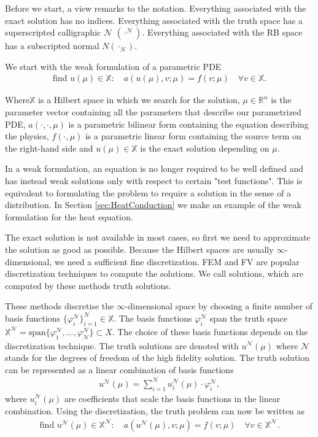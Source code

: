 Before we start, a view remarks to the notation.
Everything associated with the exact solution has no indices.
Everything associated with the truth space has a superscripted calligraphic $\mathcal{ N }$ $\left(\cdot^\mathcal{ N }\right)$.
Everything associated with the RB space has a subscripted normal $N \left(\cdot_N\right)$.

We start with the weak formulation of a parametric PDE
\begin{align}
\text{find }u(\mu) \in \mathbb{X} :\quad a(u(\mu),v;\mu) = f(v;\mu) \quad \forall v \in \mathbb{X}.
\label{eq:weakform}
\end{align}

Where$\mathbb{X}$ is a Hilbert space in which we search for the solution,
$\mu \in \mathbb{R}^n$ is the parameter vector containing all the parameters that describe our parametrized PDE,
$a(\cdot,\cdot,\mu)$ is a parametric bilinear form containing the equation describing the physics,
$f(\cdot,\mu)$ is a parametric linear form containing the source term on the right-hand side and
$u(\mu)\in \mathbb{X}$ is the exact solution depending on $\mu$.

In a weak formulation, an equation is no longer required to be well defined and has instead weak solutions only with respect to certain "test functions". This is equivalent to formulating the problem to require a solution in the sense of a distribution.
In Section \ref{sec:HeatConduction} we make an example of the weak formulation for the heat equation.

The exact solution is not available in most cases, so first we need to approximate the solution as good as possible.
Because the Hilbert spaces are usually $ \infty $-dimensional, we need a sufficient fine discretization.
FEM and FV are popular discretization techniques to compute the solutions.
We call solutions, which are computed by these methods truth solutions.

These methods discretise  the  $ \infty $-dimensional space by choosing a finite number of basis functions $\{ \varphi_i^\mathcal{ N } \}_{i=1}^{\mathcal{ N }} \in \mathbb{X}$.
The basis functions $\varphi_i^\mathcal{ N }$ span the truth space
$\mathbb{X}^\mathcal{ N } = \text{span} \{ \varphi_1^\mathcal{ N }, ..., \varphi_\mathcal{N}^\mathcal{N}  \} \subset{X} $.
The choice of these basis functions depends on the discretization technique. 
The truth solutions are denoted with  $u^\mathcal{N}(\mu)$ where $\mathcal{N}$ stands for the degrees of freedom of the high fidelity solution.
The truth solution can be represented as a linear combination of basis functions
\begin{align}
\label{eq:truthSolution}
u^\mathcal{ N } (\mu) = \sum_{i=1}^\mathcal{ N } u_i^\mathcal{ N } (\mu) \cdot \varphi_i^\mathcal{ N },
\end{align}
where $ u_i^\mathcal{ N } (\mu)$ are coefficients that scale the basis functions in the linear combination.
Using the discretization, the truth problem can now be written as
\begin{align}
\label{eq:truthProblem}
\text{find }u^\mathcal{N}(\mu) \in \mathbb{X}^\mathcal{N} :\quad a(u^\mathcal{N}(\mu),v;\mu) = f(v;\mu) \quad \forall v \in \mathbb{X}^\mathcal{N}.
\end{align}


